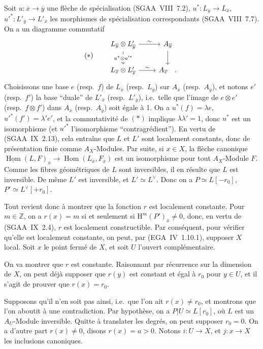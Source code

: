 \documentclass[11pt]{article}
\renewcommand{\H}{\mathrm{H}}
\DeclareMathOperator{\Hom}{Hom}
\newcommand{\Z}{\mathbb{Z}}
\newcommand{\ol}[1]{\overline{#1}}
\providecommand{\Hom}{\operatorname{Hom}}
\providecommand{\Z}{\mathbb Z}
\providecommand{\Hom}{\operatorname{Hom}}
\begin{document}
Soit $u : \ol{x} \to \ol{y}$ une flèche de spécialisation (SGAA~VIII~7.2), $u^{*} : L_{\ol{y}} \to L_{\ol{x}}$, $u'^{*} : L'_{\ol{y}} \to L'_{\ol{x}}$ les morphismes de spécialisation correspondants (SGAA~VIII~7.7). On a un diagramme commutatif
\begin{equation*}
(*)\qquad
\begin{tikzcd}
L_{\ol{y}} \otimes L'_{\ol{y}} \arrow[r,"\sim"] \arrow[d,"u^{*} \otimes u'^{*}" description] & A_{\ol{y}} \arrow[d] \\
L_{\ol{x}} \otimes L'_{\ol{x}} \arrow[r,"\sim"] & A_{\ol{x}}\quad .
\end{tikzcd}
\end{equation*}
Choisissons une base $e$ (resp.~$f$) de $L_{\ol{x}}$ (resp.~$L_{\ol{y}}$) sur $A_{\ol{x}}$ (resp.~$A_{\ol{y}}$), et notons $e'$ (resp.~$f'$) la base ``duale'' de $L'_{\ol{x}}$ (resp.~$L'_{\ol{y}}$), i.e.~telle que l'image de $e \otimes e'$ (resp.~$f \otimes f'$) dans $A_{\ol{x}}$ (resp.~$A_{\ol{y}}$) soit égale à 1. On a $u^{*}(f) = \lambda e$, $u'^{*}(f') = \lambda' e'$, et la commutativité de $(*)$ implique $\lambda\lambda' = 1$, donc $u^{*}$ est un isomorphisme (et $u'^{*}$ l'isomorphisme ``contragrédient''). En vertu de (SGAA~IX~2.13), cela entraîne que $L$ et $L'$ sont localement constants, donc de présentation finie comme $A_X$-Modules. Par suite, si $x \in X$, la flèche canonique $\underline{\Hom}(L,F)_{\ol{x}} \to \Hom(L_{\ol{x}}, F_{\ol{x}})$ est un isomorphisme pour tout $A_X$-Module $F$. Comme les fibres géométriques de $L$ sont inversibles, il en résulte que $L$ est inversible. De même $L'$ est inversible, et $L' \simeq L^{\vee}$. Donc on a $P \simeq L[-r_0]$, $P' \simeq L^{\vee}[+r_0]$.

Tout revient donc à montrer que la fonction $r$ est localement constante. Pour $m \in \Z$, on a $r(x) = m$ si et seulement si $\H^{m}(P')_{\ol{x}} \neq 0$, donc, en vertu de (SGAA~IX~2.4), $r$ est localement constructible. Par conséquent,
pour vérifier qu'elle est localement constante, on peut, par (EGA~IV~1.10.1), supposer $X$ local. Soit $x$ le point fermé de $X$, et soit $U$ l'ouvert complémentaire.

On va montrer que $r$ est constante. Raisonnant par récurrence sur la dimension de $X$, on peut déjà supposer que $r(y)$ est constant et égal à $r_0$ pour $y \in U$, et il s'agit de prouver que $r(x) = r_0$.

Supposons qu'il n'en soit pas ainsi, i.e.~que l'on ait $r(x) \neq r_0$, et montrons que l'on aboutit à une contradiction. Par hypothèse, on a $P|U \simeq L[r_0]$, où $L$ est un $A_U$-Module inversible. Quitte à translater les degrés, on peut supposer $r_0 = 0$. On a d'autre part $r(x) \neq 0$, disons $r(x) = a > 0$. Notons $i : U \to X$, et $j : x \to X$ les inclusions canoniques.
\end{document}
